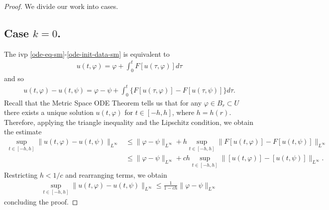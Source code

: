 \documentclass[12pt,reqno]{amsart}
\numberwithin{equation}{section}  %
\newcommand{\vp}{\varphi}
\begin{document}
\begin{proof}
We divide our work into cases.
\subsection*{Case $k = 0$.} The ivp \eqref{ode-eq-sm}-\eqref{ode-init-data-sm} is equivalent to 
%
%
\begin{equation*}
\begin{split}
u(t, \vp) = \vp + \int_{0}^{t} F[u(\tau, \vp)] d \tau
\end{split}
\end{equation*}
%
and so
%
%
%
\begin{equation*}
\begin{split}
u(t, \vp) - u(t, \psi) = \vp - \psi + \int_{0}^{t} \{F[u(\tau, \vp)] - F[u(\tau, \psi)]\} d \tau.
\end{split}
\end{equation*}
%
Recall that the Metric Space ODE Theorem tells us that for any $\vp \in B_{r} \subset U$ there exists a unique solution $u(t, \vp)$ for $t \in [-h, h]$, where $h = h(r)$. Therefore, applying the triangle inequality and the Lipschitz condition, we obtain the estimate
\begin{equation*}
\begin{split}
\sup_{t \in [-h, h]} \|u(t, \vp) - u(t, \psi)\|_{L^{\infty}}
& \le \|\vp -
\psi\|_{L^{\infty}} +  h \sup_{t \in [-h, h]} \|F[u(t, \vp)] - F[u(t, \psi)] \|_{L^{\infty}}
\\
& \le \|\vp - \psi\|_{L^{\infty}} +  ch \sup_{t \in [-h, h]} \|[u(t, \vp)] -
[u(t, \psi)] \|_{L^{\infty}}.
\end{split}
\end{equation*}
Restricting $h < 1/c$ and rearranging terms, we obtain
%
%
\begin{equation*}
\begin{split}
\sup_{t \in [-h, h]} \| u(t, \vp) - u(t, \psi) \|_{L^{\infty}} \le \frac{1}{1-ch} \| \vp - \psi \|_{L^{\infty}}
\end{split}
\end{equation*}
%
%
concluding the proof.

\end{proof}
\end{document}

